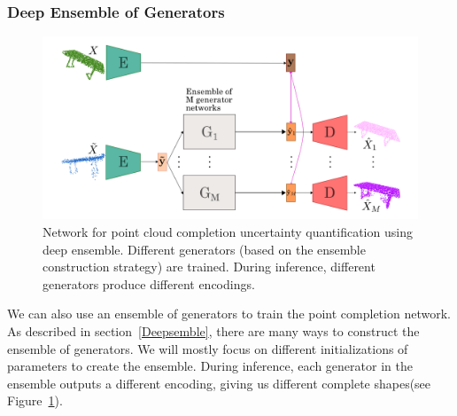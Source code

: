        \subsubsection{Deep Ensemble of Generators}
        \begin{figure}[htb]
          \begin{center}
          \includegraphics[width=\linewidth]{figures/ensemble_network.png}
          \end{center}
          \caption{Network for point cloud completion uncertainty quantification using deep ensemble. Different generators (based on the ensemble construction strategy) are trained. During inference, different generators produce different encodings.}\label{fig:ens_net}
        \end{figure}
        We can also use an ensemble of generators to train the point completion network. As described in section~\ref{Deepsemble}, there are many ways to construct the ensemble of generators. We will mostly focus on different initializations of parameters to create the ensemble. During inference, each generator in the ensemble outputs a different encoding, giving us different complete shapes(see Figure~\ref{fig:ens_net}).


